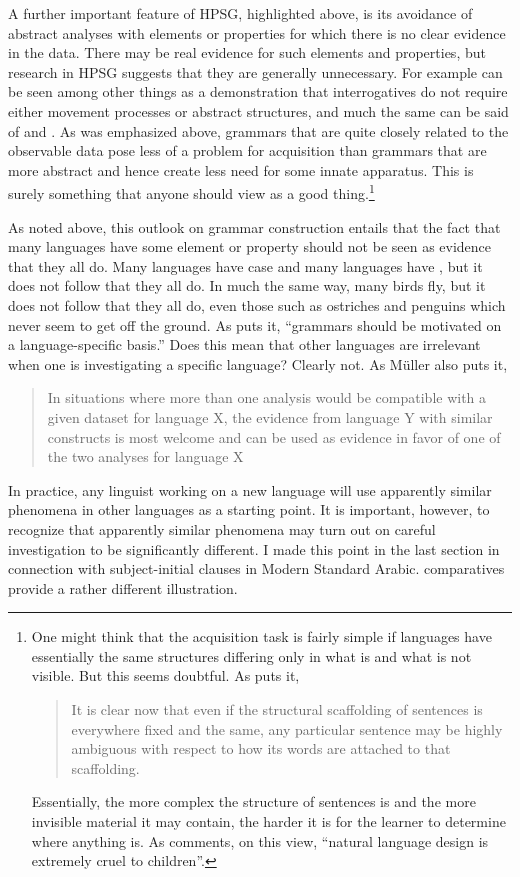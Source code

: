 \documentclass[output=paper]{langsci/langscibook}
\begin{document}
A further important feature of \gls{HPSG}, highlighted above, is its avoidance
of abstract analyses with elements or properties for which there is no clear
evidence in the data. There may be real evidence for such elements and
properties, but research in \gls{HPSG} suggests that they are generally
unnecessary.  For example \citet{GinSag2000} can be seen among other things as
a demonstration that  interrogatives do not require either
movement processes or abstract structures, and much the same can be said of
\citet{Sag1997} and  . As was emphasized above,
grammars that are quite closely related to the observable data pose less
of a problem for acquisition than grammars that are more abstract and hence
create less need for some innate apparatus. This is surely something that
anyone should view as a good thing.\footnote{One might think that the acquisition
    task is fairly simple if languages have essentially the same structures
    differing only in what is and what is not visible. But this seems doubtful.
    As \citet[765]{Fodor2001} puts it, \blockquote{It is clear now that even if
        the structural scaffolding of sentences is everywhere fixed and the
        same, any particular sentence may be highly ambiguous with respect to
        how its words are attached to that scaffolding.} Essentially, the more
        complex the structure of sentences is and the more invisible material
    it may contain, the harder it is for the learner to determine where
anything is. As \citet[763]{Fodor2001} comments, on this view, \enquote{natural
language design is extremely cruel to children}.}\largerpage

As noted above, this outlook on grammar construction entails that the fact that
many languages have some element or property should not be seen as evidence
that they all do. Many languages have case and many languages have
, but it does not follow that they all do. In much the same way,
many birds fly, but it does not follow that they all do, even those such as
ostriches and penguins which never seem to get off the ground. As
\citet[25]{Muller2015} puts it, \enquote{grammars should be motivated on a
    language-specific basis.} Does this mean that other languages are
    irrelevant when one is investigating a specific language?  Clearly not. As
    Müller also puts it, \blockquote[{\citealt[43]{Muller2015}}][.]{In
        situations where more than one analysis would be compatible with a
    given dataset for language X, the evidence from language Y with similar
constructs is most welcome and can be used as evidence in favor of one of the
two analyses for language X} In practice, any linguist working on a new
language will use apparently similar phenomena in other languages as a starting
point. It is important, however, to recognize that apparently similar phenomena
may turn out on careful investigation to be significantly different. I made
this point in the last section in connection with subject-initial clauses in
Modern Standard Arabic.   comparatives provide a rather different
illustration.
\end{document}
